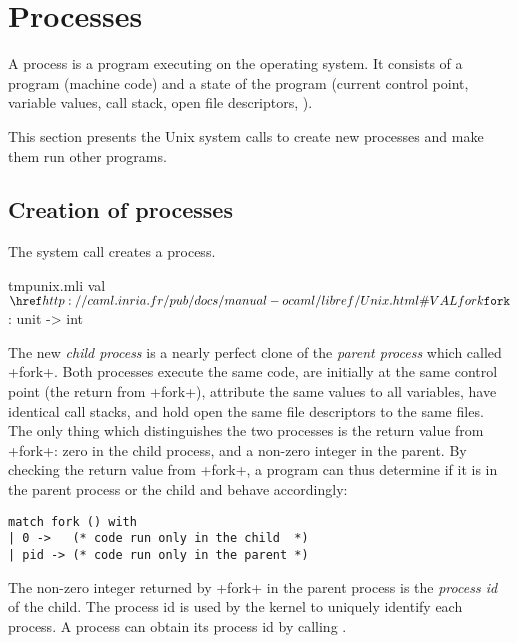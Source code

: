 %
%

\chapter{\label{sec/processes}Processes}

A process is a program executing on the operating system.  It
consists of a program (machine code) and a state of the program
(current control point, variable values, call stack, open file
descriptors, \etc).

This section presents the Unix system calls to create new processes
and make them run other programs.

\section{Creation of processes}

The system call  creates a process.
%
\begin{listingcodefile}{tmpunix.mli}
val $\libvalue{Unix}{fork}$ : unit -> int
\end{listingcodefile}
%
The new \emph{child process} is a nearly perfect clone of the
\emph{parent process} which called \ml+fork+.  Both processes execute
the same code, are initially at the same control point (the return
from \ml+fork+), attribute the same values to all variables, have
identical call stacks, and hold open the same file descriptors to
the same files.  The only thing which distinguishes the two processes
is the return value from \ml+fork+: zero in the child process,
and a non-zero integer in the parent.  By checking the return value
from \ml+fork+, a program can thus determine if it is in the parent
process or the child and behave accordingly: 
%
\begin{lstlisting}
match fork () with
| 0 ->   (* code run only in the child  *)
| pid -> (* code run only in the parent *)
\end{lstlisting}
%
The non-zero integer returned by \ml+fork+ in the parent process
is the \emph{process id} of the child.  The process id is used by
the kernel to uniquely identify each process.  A process can obtain
its process id by calling .

